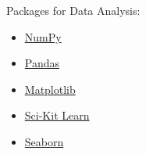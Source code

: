 \documentclass[10pt]{article}
\begin{document}
        Packages for Data Analysis:
        \begin{itemize}
            \item \href{https://numpy.org}{NumPy}
            \item \href{https://pandas.pydata.org}{Pandas}
            \item \href{https://matplotlib.org}{Matplotlib}
            \item \href{https://scikit-learn.org}{Sci-Kit Learn}
            \item \href{https://seaborn.pydata.org}{Seaborn}
        \end{itemize}

    \newpage
    
    
\end{document}
